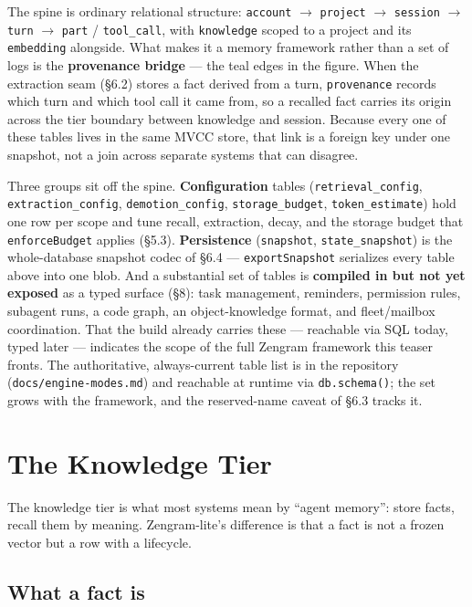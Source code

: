 \documentclass[11pt]{article}
\newcommand{\code}[1]{\texttt{#1}}
\begin{document}
The spine is ordinary relational structure: \code{account} $\to$ \code{project}
$\to$ \code{session} $\to$ \code{turn} $\to$ \code{part} / \code{tool\_call}, with
\code{knowledge} scoped to a project and its \code{embedding} alongside. What makes
it a memory framework rather than a set of logs is the \textbf{provenance bridge}
--- the teal edges in the figure. When the extraction seam (\S6.2) stores a fact
derived from a turn, \code{provenance} records which turn and which tool call it
came from, so a recalled fact carries its origin across the tier boundary between
knowledge and session. Because every one of these tables lives in the same MVCC
store, that link is a foreign key under one snapshot, not a join across separate
systems that can disagree.

Three groups sit off the spine. \textbf{Configuration} tables
(\code{retrieval\_config}, \code{extraction\_config}, \code{demotion\_config},
\code{storage\_budget}, \code{token\_estimate}) hold one row per scope and tune
recall, extraction, decay, and the storage budget that \code{enforceBudget}
applies (\S5.3). \textbf{Persistence} (\code{snapshot}, \code{state\_snapshot}) is
the whole-database snapshot codec of \S6.4 --- \code{exportSnapshot} serializes
every table above into one blob. And a substantial set of tables is
\textbf{compiled in but not yet exposed} as a typed surface (\S8): task
management, reminders, permission rules, subagent runs, a code graph, an
object-knowledge format, and fleet/mailbox coordination. That the build already
carries these --- reachable via SQL today, typed later --- indicates the scope of
the full Zengram framework this teaser fronts. The authoritative,
always-current table list is in the repository (\code{docs/engine-modes.md}) and
reachable at runtime via \code{db.schema()}; the set grows with the framework, and
the reserved-name caveat of \S6.3 tracks it.

\section{The Knowledge Tier}

The knowledge tier is what most systems mean by ``agent memory'': store facts,
recall them by meaning. Zengram-lite's difference is that a fact is not a frozen
vector but a row with a lifecycle.

\subsection{What a fact is}
\end{document}
